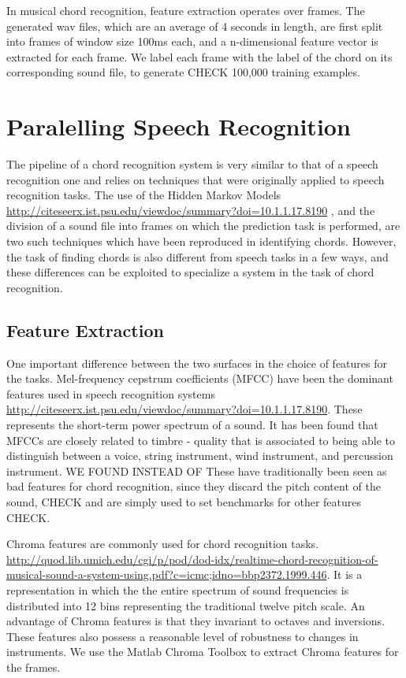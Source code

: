 \documentclass{article}
\begin{document}
In musical chord recognition, feature extraction operates over frames. The generated wav files, which are an average of 4 seconds in length, are first split into frames of window size 100ms each, and a n-dimensional feature vector is extracted for each frame. We label each frame with the label of the chord on its corresponding sound file, to generate CHECK 100,000 training examples.

\section{Paralelling Speech Recognition}

The pipeline of a chord recognition system is very similar to that of a speech recognition one and relies on techniques that were originally applied to speech recognition tasks. The use of the Hidden Markov Models \url{http://citeseerx.ist.psu.edu/viewdoc/summary?doi=10.1.1.17.8190} , and the division of a sound file into frames on which the prediction task is performed, are two such techniques which have been reproduced in identifying chords. However, the task of finding chords is also different from speech tasks in a few ways, and these differences can be exploited to specialize a system in the task of chord recognition.

\subsection{Feature Extraction}

One important difference between the two surfaces in the choice of features for the tasks. Mel-frequency cepstrum coefficients (MFCC) have been the dominant features used in speech recognition systems \url{http://citeseerx.ist.psu.edu/viewdoc/summary?doi=10.1.1.17.8190}. These represents the short-term power spectrum of a sound. It has been found that MFCCs are closely related to timbre - quality that is associated to being able to distinguish between a voice, string instrument, wind instrument, and percussion instrument. WE FOUND INSTEAD OF These have traditionally been seen as bad features for chord recognition, since they discard the pitch content of the sound, CHECK and are simply used to set benchmarks for other features CHECK.

Chroma features are commonly used for chord recognition tasks. \url{http://quod.lib.umich.edu/cgi/p/pod/dod-idx/realtime-chord-recognition-of-musical-sound-a-system-using.pdf?c=icmc;idno=bbp2372.1999.446}. It is a representation in which the the entire spectrum of sound frequencies is distributed into 12 bins representing the traditional twelve pitch scale. An advantage of Chroma features is that they invariant to octaves and inversions. These features also possess a reasonable level of robustness to changes in instruments. We use the Matlab Chroma Toolbox to extract Chroma features for the frames.
\end{document}
